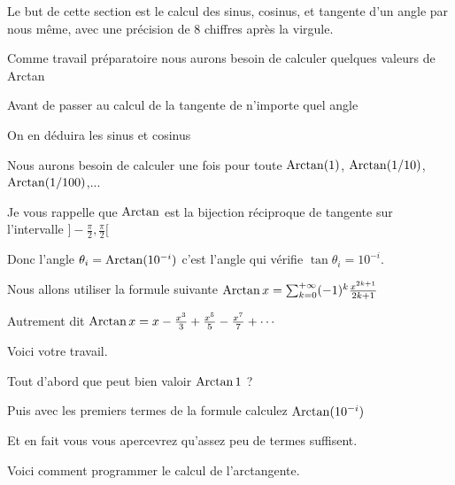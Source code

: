 






\debuttexte

\diapo

\change

Le but de cette section est le calcul des sinus, cosinus, et tangente d'un angle par nous même,
avec une précision de $8$ chiffres après la virgule.


\change

Comme travail préparatoire nous aurons besoin de calculer quelques valeurs de Arctan

\change

Avant de passer au calcul de la tangente de n'importe quel angle

\change

On en déduira les sinus et cosinus


\diapo


Nous aurons besoin de calculer une fois pour toute 
$\mathop{\mathrm{Arctan}}\nolimits (1)$, $\mathop{\mathrm{Arctan}}\nolimits (1/10)$, $\mathop{\mathrm{Arctan}}\nolimits (1/100)$,...

\change

Je vous rappelle que $\mathop{\mathrm{Arctan}}\nolimits$ est la bijection réciproque de tangente 
sur l'intervalle $]-\frac\pi2,\frac\pi2[$

Donc l'angle $\theta_i = \mathop{\mathrm{Arctan}}\nolimits (10^{-i})$ c'est l'angle qui vérifie $\tan \theta_i = 10^{-i}$.

\change


Nous allons utiliser la formule suivante
$\mathop{\mathrm{Arctan}}\nolimits x = \sum_{k=0}^{+\infty} (-1)^k\frac{x^{2k+1}}{2k+1}$

Autrement dit $\mathop{\mathrm{Arctan}}\nolimits x= x - \frac{x^3}{3}+ \frac{x^5}{5}-\frac{x^7}{7}+\cdots$


\change

Voici votre travail.

Tout d'abord que peut bien valoir $\mathop{\mathrm{Arctan}}\nolimits 1$ ?

Puis avec les premiers termes de la formule calculez $\mathop{\mathrm{Arctan}}\nolimits (10^{-i})$

Et en fait vous vous apercevrez qu'assez peu de termes suffisent.

\diapo


Voici comment programmer le calcul de l'arctangente.

